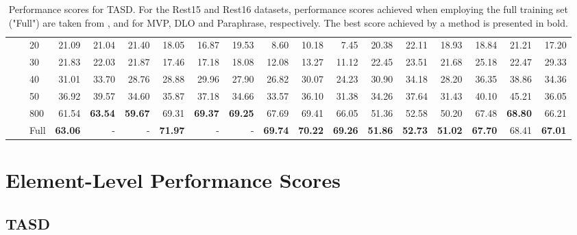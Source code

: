 \begin{table*}[!h]
{\begin{tabular}{lllrrr|rrr|rrr|rrr|rrr}
 \textbf{} & \textbf{} & 20 & 21.09 & 21.04 & 21.40 & 18.05 & 16.87 & 19.53 & 8.60 & 10.18 & 7.45 & 20.38 & 22.11 & 18.93 & 18.84 & 21.21 & 17.20 \\ 
 \textbf{} & \textbf{} & 30 & 21.83 & 22.03 & 21.87 & 17.46 & 17.18 & 18.08 & 12.08 & 13.27 & 11.12 & 22.45 & 23.51 & 21.68 & 25.18 & 22.47 & 29.33 \\ 
 \textbf{} & \textbf{} & 40 & 31.01 & 33.70 & 28.76 & 28.88 & 29.96 & 27.90 & 26.82 & 30.07 & 24.23 & 30.90 & 34.18 & 28.20 & 36.35 & 38.86 & 34.36 \\ 
 \textbf{} & \textbf{} & 50 & 36.92 & 39.57 & 34.60 & 35.87 & 37.18 & 34.66 & 33.57 & 36.10 & 31.38 & 34.26 & 37.64 & 31.43 & 40.10 & 45.21 & 36.05 \\ 
 \textbf{} & \textbf{} & 800 & 61.54 & \textbf{63.54} & \textbf{59.67} & 69.31 & \textbf{69.37} & \textbf{69.25} & 67.69 & 69.41 & 66.05 & 51.36 & 52.58 & 50.20 & 67.48 & \textbf{68.80} & 66.21 \\ 
 \textbf{} & \textbf{} & Full & \textbf{63.06} & - & - & \textbf{71.97} & - & - & \textbf{69.74} & \textbf{70.22} & \textbf{69.26} & \textbf{51.86} & \textbf{52.73} & \textbf{51.02} & \textbf{67.70} & 68.41 & \textbf{67.01} \\ 
\hline
\end{tabular}
}

\caption{Performance scores for TASD. For the Rest15 and Rest16 datasets, performance scores achieved when employing the full training set ("Full") are taken from \citet{gou2023mvp}, \citet{hu2022improving} and \citet{zhang2021towards} for MVP, DLO and Paraphrase, respectively. The best score achieved by a method is presented in bold.}\label{fig:results-absa-tasd}
\end{table*}

\newpage

\section{Element-Level Performance Scores}
\label{appendix:performance-scores-element}

\subsection{TASD}

